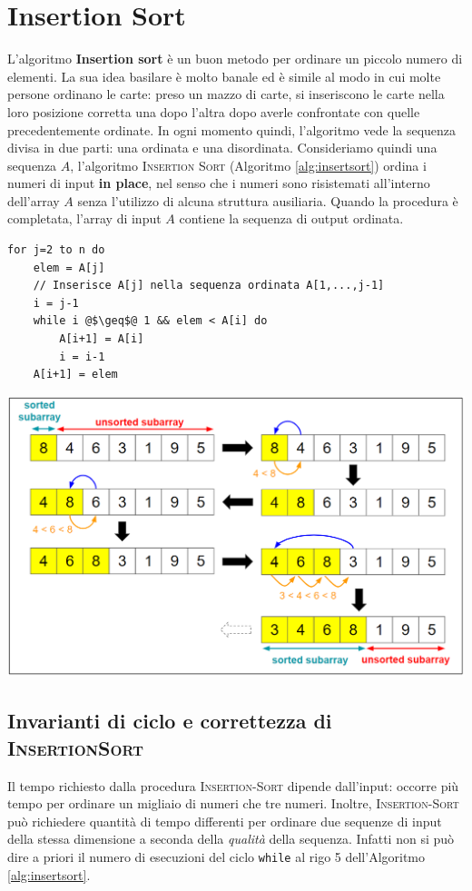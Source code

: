 \section{Insertion Sort}
L'algoritmo \textbf{Insertion sort} è un buon metodo per ordinare un piccolo numero di elementi. La sua idea basilare è molto banale ed è simile al modo in cui molte persone ordinano le carte: preso un mazzo di carte, si inseriscono le carte nella loro posizione corretta una dopo l'altra dopo averle confrontate con quelle precedentemente ordinate. In ogni momento quindi, l'algoritmo vede la sequenza divisa in due parti: una ordinata e una disordinata. Consideriamo quindi una sequenza $A$, l'algoritmo \textsc{Insertion Sort} (Algoritmo \ref{alg:insertsort}) ordina i numeri di input \textbf{in place}, nel  senso che i numeri sono risistemati all'interno dell'array $A$ senza l'utilizzo di alcuna struttura ausiliaria. Quando la procedura è completata, l'array di input $A$ contiene la sequenza di output ordinata.

\begin{lstlisting}[caption={\textsc{InsertionSort}(A,n)},language=asd,label=alg:insertsort]
for j=2 to n do
	elem = A[j]
	// Inserisce A[j] nella sequenza ordinata A[1,...,j-1]
	i = j-1
	while i @$\geq$@ 1 && elem < A[i] do
		A[i+1] = A[i]
		i = i-1
	A[i+1] = elem
\end{lstlisting}

\begin{center}
	\includegraphics[scale=.3]{res/InsertionSort1}
\end{center}

\subsection{Invarianti di ciclo e correttezza di \textsc{InsertionSort}}
Il tempo richiesto dalla procedura \textsc{Insertion-Sort} dipende dall'input: occorre più tempo per ordinare un migliaio di numeri che tre numeri. Inoltre, \textsc{Insertion-Sort} può richiedere quantità di tempo differenti per ordinare due sequenze di input della stessa dimensione a seconda della \textit{qualità} della sequenza. Infatti non si può dire a priori il numero di esecuzioni del ciclo \texttt{while} al rigo 5 dell'Algoritmo \ref{alg:insertsort}.

